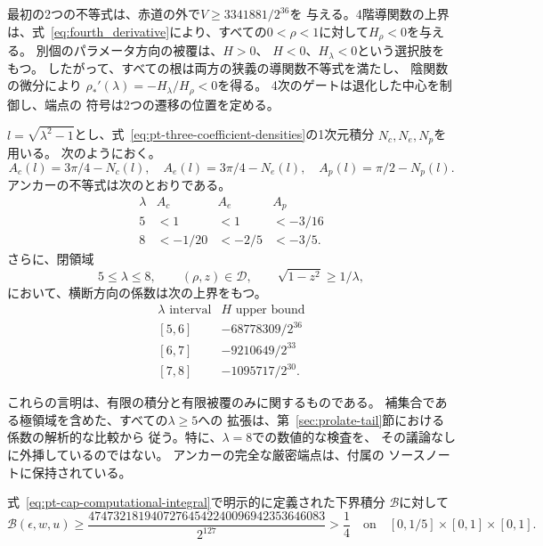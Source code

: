 最初の2つの不等式は、赤道の外で$V\geq3341881/2^{36}$を
与える。4階導関数の上界は、式~\eqref{eq:fourth_derivative}により、すべての$0<\rho<1$に対して$H_\rho<0$を与える。
別個のパラメータ方向の被覆は、$H>0$、
$H<0$、$H_\lambda<0$という選択肢をもつ。
したがって、すべての根は両方の狭義の導関数不等式を満たし、
陰関数の微分により
$\rho_*'(\lambda)=-H_\lambda/H_\rho<0$を得る。
4次のゲートは退化した中心を制御し、端点の
符号は2つの遷移の位置を定める\citep{data-window}。

\begin{computationalassertion}[扁長側の裾の有限部分]
\label{comp:c5}
$l=\sqrt{\lambda^2-1}$とし、式~\eqref{eq:pt-three-coefficient-densities}の1次元積分
$N_c,N_e,N_p$を用いる。
次のようにおく。
\[
 A_c(l)=3\pi/4-N_c(l),\quad
 A_e(l)=3\pi/4-N_e(l),\quad
 A_p(l)=\pi/2-N_p(l).
\]
アンカーの不等式は次のとおりである。
\[
 \begin{array}{c|ccc}
 \lambda&A_c&A_e&A_p\\ \hline
 5&<1&<1&<-3/16\\
 8&<-1/20&<-2/5&<-3/5.
 \end{array}
\]
さらに、閉領域
\[
 5\leq\lambda\leq8,\qquad(\rho,z)\in\mathcal D,\qquad
 \sqrt{1-z^2}\geq1/\lambda,
\]
において、横断方向の係数は次の上界をもつ。
\[
 \begin{array}{c|c}
 \lambda\text{ interval}&H\text{ upper bound}\\ \hline
 {[5,6]}&-68778309/2^{36}\\
 {[6,7]}&-9210649/2^{33}\\
 {[7,8]}&-1095717/2^{30}.
 \end{array}
\]
\end{computationalassertion}

これらの言明は、有限の積分と有限被覆のみに関するものである。
補集合である極領域を含めた、すべての$\lambda\geq5$への
拡張は、第~\ref{sec:prolate-tail}節における係数の解析的な比較から
従う。特に、$\lambda=8$での数値的な検査を、
その議論なしに外挿しているのではない。
アンカーの完全な厳密端点は、付属の
ソースノートに保持されている\citep{data-chord}。

\begin{computationalassertion}[極での下側包絡積分]
\label{comp:c6}
式~\eqref{eq:pt-cap-computational-integral}で明示的に定義された下界積分
$\mathcal B$に対して
\[
 \mathcal B(\epsilon,w,u)\geq
 \frac{47473218194072764542240096942353646083}{2^{127}}
 >\frac14
 \quad\text{on}\quad
 [0,1/5]\times[0,1]\times[0,1].
\]
\end{computationalassertion}

